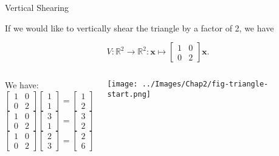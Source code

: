 \documentclass[xcoler=dvipsnames, aspectratio=169]{beamer}
\begin{document}
\begin{frame}{Vertical Shearing}

If we would like to vertically shear the triangle  by a factor of 2, we have

\[ V: \mathbb{R}^2 \to \mathbb{R}^2: \mathbf{x} \mapsto \begin{bmatrix} 1 & 0 \\ 0 & 2 \end{bmatrix} \mathbf{x} .\]


\begin{columns}[T]

\column{0.5\tw}

We have:
\[ \begin{bmatrix} 1 & 0 \\ 0 & 2 \end{bmatrix} \begin{bmatrix} 1 \\ 1 \end{bmatrix} = \begin{bmatrix} 1 \\ 2 \end{bmatrix} \]
    \pause
\[ \begin{bmatrix} 1 & 0 \\ 0 & 2 \end{bmatrix} \begin{bmatrix} 3 \\ 1 \end{bmatrix} =  \begin{bmatrix} 3 \\ 2 \end{bmatrix} \]
    \pause
 \[ \begin{bmatrix} 1 & 0 \\ 0 & 2 \end{bmatrix} \begin{bmatrix} 2 \\ 3 \end{bmatrix} =  \begin{bmatrix} 2 \\ 6 \end{bmatrix} \]

\column{0.5\tw}

\texttt{[image: ../Images/Chap2/fig-triangle-start.png]}

\end{columns}

\end{frame}
\end{document}

